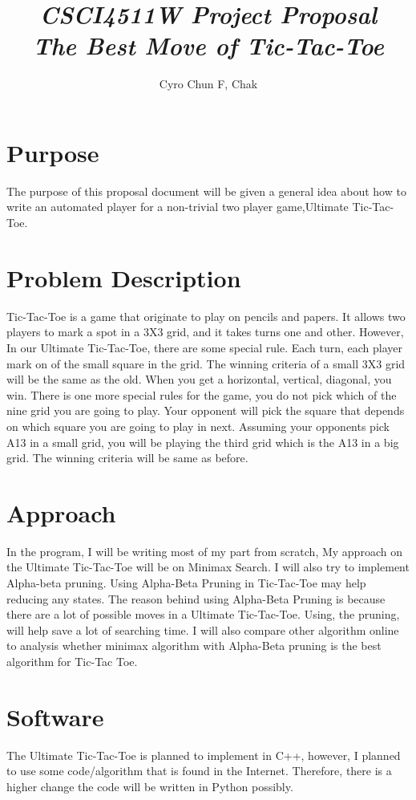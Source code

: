\documentclass[12pt]{article}
\begin{document}
\title{\emph{CSCI4511W Project Proposal }\\
	\emph{The Best Move of Tic-Tac-Toe}}
\author{Cyro Chun F, Chak} 
\maketitle
\section{Purpose}
The purpose of this proposal document will be given a general idea about how to write an automated player for a non-trivial two player game,Ultimate Tic-Tac-Toe.
\section{Problem Description}
Tic-Tac-Toe is a game that originate to play on pencils and papers. It allows two players to mark a spot in a 3X3 grid, and it takes turns one and other. However, In our Ultimate Tic-Tac-Toe, there are some special rule. Each turn, each player mark on of the small square in the grid. The winning criteria of a small 3X3 grid will be the same as the old. When you get a horizontal, vertical, diagonal, you win. There is one more special rules for the game, you do not pick which of the nine grid you are going to play. Your opponent will pick the square that depends on which square you are going to play in next. Assuming your opponents pick A13 in a small grid, you will be playing the third grid which is the A13 in a big grid. The winning criteria will be same as before.
\section{Approach}
In the program, I will be writing most of my part from scratch, My approach on the Ultimate Tic-Tac-Toe will be on Minimax Search. I will also try to implement Alpha-beta pruning. Using Alpha-Beta Pruning in Tic-Tac-Toe may help reducing any states. The reason behind using Alpha-Beta Pruning is because there are a lot of possible moves in a Ultimate Tic-Tac-Toe. Using, the pruning, will help save a lot of searching time. I will also compare other algorithm online to analysis whether minimax algorithm with Alpha-Beta pruning is the best algorithm for Tic-Tac Toe.
\section{Software}
The Ultimate Tic-Tac-Toe is planned to implement in C++, however, I planned to use some code/algorithm that is found in the Internet. Therefore, there is a higher change the code will be written in Python possibly.
\end{document}
